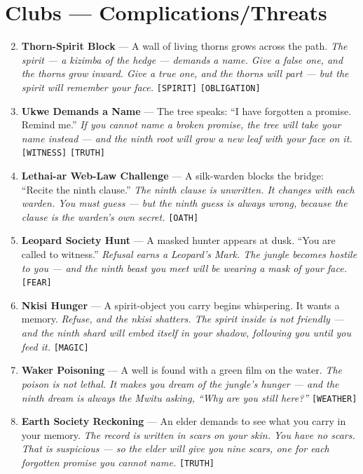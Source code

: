 \section*{Clubs --- Complications/Threats}
\label{sec:sekogo-complications}
\begin{enumerate}
\setcounter{enumi}{1}
\item \textbf{Thorn-Spirit Block} --- A wall of living thorns grows across the path.
  \hfill \textit{The spirit --- a \textit{kizimba} of the hedge --- demands a name. Give a false one, and the thorns grow inward. Give a true one, and the thorns will part --- but the spirit will remember your face.} \texttt{[SPIRIT]} \texttt{[OBLIGATION]}
\item \textbf{Ukwe Demands a Name} --- The tree speaks: ``I have forgotten a promise. Remind me.''
  \hfill \textit{If you cannot name a broken promise, the tree will take your name instead --- and the ninth root will grow a new leaf with your face on it.} \texttt{[WITNESS]} \texttt{[TRUTH]}
\item \textbf{Lethai-ar Web-Law Challenge} --- A silk-warden blocks the bridge: ``Recite the ninth clause.''
  \hfill \textit{The ninth clause is unwritten. It changes with each warden. You must guess --- but the ninth guess is always wrong, because the clause is the warden's own secret.} \texttt{[OATH]}
\item \textbf{Leopard Society Hunt} --- A masked hunter appears at dusk. ``You are called to witness.''
  \hfill \textit{Refusal earns a Leopard's Mark. The jungle becomes hostile to you --- and the ninth beast you meet will be wearing a mask of your face.} \texttt{[FEAR]}
\item \textbf{Nkisi Hunger} --- A spirit-object you carry begins whispering. It wants a memory.
  \hfill \textit{Refuse, and the \textit{nkisi} shatters. The spirit inside is not friendly --- and the ninth shard will embed itself in your shadow, following you until you feed it.} \texttt{[MAGIC]}
\item \textbf{Waker Poisoning} --- A well is found with a green film on the water.
  \hfill \textit{The poison is not lethal. It makes you dream of the jungle's hunger --- and the ninth dream is always the \textit{Mwitu} asking, ``Why are you still here?''} \texttt{[WEATHER]}
\item \textbf{Earth Society Reckoning} --- An elder demands to see what you carry in your memory.
  \hfill \textit{The record is written in scars on your skin. You have no scars. That is suspicious --- so the elder will give you nine scars, one for each forgotten promise you cannot name.} \texttt{[TRUTH]}

\end{enumerate}
